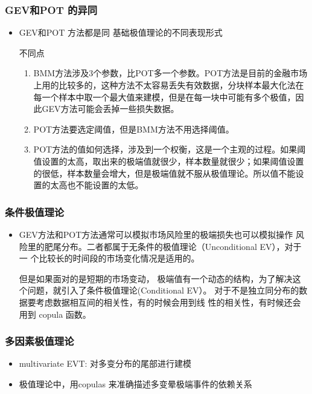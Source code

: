 \subsubsection{GEV和POT 的异同}

\begin{itemize}

    \item GEV和POT 方法都是同 基础极值理论的不同表现形式


\begin{note}{不同点}
    \begin{enumerate}
        \item BMM方法涉及3个参数，比POT多一个参数。POT方法是目前的金融市场上用的比较多的，这种方法不太容易丢失有效数据，分块样本最大化法在每一个样本中取一个最大值来建模，但是在每一块中可能有多个极值，因此GEV方法可能会丢掉一些损失数据。
        \item POT方法要选定阈值，但是BMM方法不用选择阈值。
        \item POT方法的值如何选择，涉及到一个权衡，这是一个主观的过程。如果阈值设置的太高，取出来的极端值就很少，样本数量就很少；如果阈值设置的很低，样本数量会增大，但是极端值就不服从极值理论。所以值不能设置的太高也不能设置的太低。

    \end{enumerate}
\end{note}

\end{itemize}

\subsubsection{条件极值理论}
\begin{itemize}
    \item GEV方法和POT方法通常可以模拟市场风险里的极端损失也可以模拟操作
    风险里的肥尾分布。二者都属于无条件的极值理论（Unconditional EV），对于一
    个比较长的时间段的市场变化情况是适用的。
    
    但是如果面对的是短期的市场变动，
    极端值有一个动态的结构，为了解决这个问题，就引入了条件极值理论(Conditional
    EV）。
    对于不是独立同分布的数据要考虑数据相互间的相关性，有的时候会用到线
    性的相关性，有时候还会用到 copula 函数。
\end{itemize}


\subsubsection{多因素极值理论}
\begin{itemize}
    \item multivariate EVT: 对多变分布的尾部进行建模
    \item 极值理论中，用copulas 来准确描述多变晕极端事件的依赖关系
\end{itemize}

